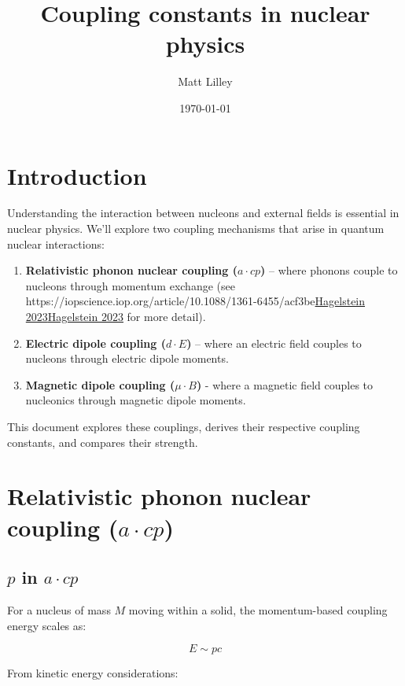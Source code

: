 \documentclass[
]{article}
\title{Coupling constants in nuclear physics}
\author{Matt Lilley}
\date{\today}  %
\let\oldhref\href
\renewcommand{\href}[2]{\ifx#1\urlprefix\oldhref{#1}{#2}\else\uline{\oldhref{#1}{#2}}\fi}
\renewcommand{\[}{\begin{equation}}
\renewcommand{\]}{\end{equation}}
\providecommand{\tightlist}{%
  \setlength{\itemsep}{0pt}\setlength{\parskip}{0pt}}
\begin{document}
\maketitle

\section{Introduction}\label{introduction}

Understanding the interaction between nucleons and external fields is
essential in nuclear physics. We'll explore two coupling mechanisms that
arise in quantum nuclear interactions:

\begin{enumerate}
\def\labelenumi{\arabic{enumi}.}
\tightlist
\item
  \textbf{Relativistic phonon nuclear coupling (\(a \cdot cp\))} --
  where phonons couple to nucleons through momentum exchange (see
  \href{https://iopscience.iop.org/article/10.1088/1361-6455/acf3be}{Hagelstein
  2023} for more detail).
\item
  \textbf{Electric dipole coupling (\(d \cdot E\))} -- where an electric
  field couples to nucleons through electric dipole moments.
\item
  \textbf{Magnetic dipole coupling (\(\mu \cdot B\))} - where a magnetic
  field couples to nucleonics through magnetic dipole moments.
\end{enumerate}

This document explores these couplings, derives their respective
coupling constants, and compares their strength.

\section{\texorpdfstring{Relativistic phonon nuclear coupling
(\(a \cdot cp\))}{Relativistic phonon nuclear coupling (a \textbackslash cdot cp)}}\label{relativistic-phonon-nuclear-coupling-a-cdot-cp}

\subsection{\texorpdfstring{\(p\) in
\(a \cdot cp\)}{p in a \textbackslash cdot cp}}\label{p-in-a-cdot-cp}

For a nucleus of mass \(M\) moving within a solid, the momentum-based
coupling energy scales as:

\[
E \sim p c 
\]

From kinetic energy considerations:
\end{document}
